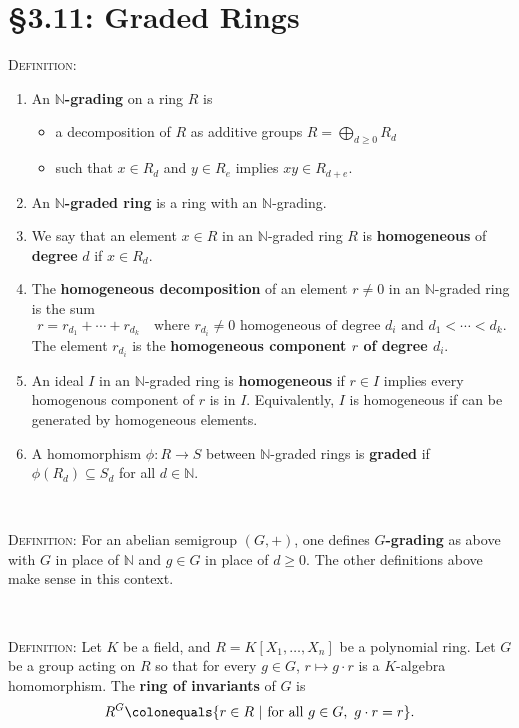 \documentclass[12pt]{amsart}
\newcommand{\N}{\mathbb{N}}
\newcommand{\1}{\mathbbm{1}}
\newcommand{\showsol}[1]{\def\displaysol{#1}}
\newcommand\ceq{\colonequals}
\begin{document}
\showsol{1}
	
	\thispagestyle{empty}
	
	\section*{\S3.11: Graded Rings}	

\begin{framed}

\noindent \textsc{Definition:} 
\begin{enumerate}
\item An \textbf{$\N$-grading} on a ring $R$ is 
\begin{itemize}
\item a decomposition of $R$ as additive groups $R= \bigoplus_{d\geq 0} R_d$
\item such that $x\in R_d$ and $y\in R_e$ implies $xy\in R_{d+e}$. 
\end{itemize}
\item An \textbf{$\N$-graded ring} is a ring with an $\N$-grading.

\item We say that an element $x\in R$ in an $\N$-graded ring $R$ is \textbf{homogeneous} of \textbf{degree} $d$ if $x\in R_d$.

\item The \textbf{homogeneous decomposition} of an element $r\neq 0$ in an $\N$-graded ring is the sum
\[ r = r_{d_1} + \cdots + r_{d_k} \quad \text{where $r_{d_i}\neq 0$ homogeneous of degree $d_i$ and $d_1<\cdots < d_k$}.\]
The element $r_{d_i}$ is the \textbf{homogeneous component $r$ of degree $d_i$}.

\item An ideal $I$ in an $\N$-graded ring is \textbf{homogeneous} if $r\in I$ implies every homogenous component of $r$ is in $I$. Equivalently, $I$ is homogeneous if can be generated by homogeneous elements.
\item A homomorphism $\phi:R\to S$ between $\N$-graded rings is \textbf{graded} if $\phi(R_d) \subseteq S_d$ for all $d\in \N$.
\end{enumerate}

\

\noindent \textsc{Definition:} For an abelian semigroup $(G,+)$, one defines \textbf{$G$-grading} as above with $G$ in place of $\N$ and $g\in G$ in place of $d\geq 0$. The other definitions above make sense in this context.

\


\noindent \textsc{Definition:} Let $K$ be a field, and $R=K[X_1,\dots,X_n]$ be a polynomial ring. Let $G$ be a group acting on $R$ so that for every $g\in G$,  $r\mapsto g\cdot r$ is a $K$-algebra homomorphism. The \textbf{ring of invariants} of $G$ is
\[ R^G \ceq \{ r\in R \ | \ \text{for all} \ g\in G, \ g\cdot r = r \}.\]
 \end{framed}
\end{document}
